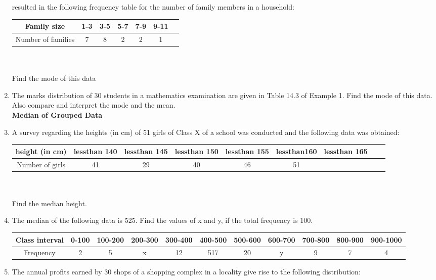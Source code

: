 \begin{enumerate}[label=\arabic*.,ref=\thesubsection.\theenumi]
resulted in the following frequency table for the number of family members in a
household:
\begin{tabular}{|c|c|c|c|c|c|c|}
\hline
Family size &1-3&3-5&5-7&7-9&9-11&\\
\hline
Number of families &7&8&2&2&1\\
\hline
\end{tabular}\\\\
Find the mode of this data
\item The marks distribution of 30 students in a mathematics examination are
given in Table 14.3 of Example 1. Find the mode of this data. Also compare and
interpret the mode and the mean.\\
{\Large \textbf{Median of Grouped Data}}
\item A survey regarding the heights (in cm) of 51 girls of Class X of a school
was conducted and the following data was obtained:
\begin{tabular}{|c|c|c|c|c|c|c|c|c|}
\hline
height (in cm) &lessthan 140&lessthan 145&lessthan 150&lessthan 155&lessthan160&lessthan 165\\
\hline
Number of girls &41&29&40&46&51\\
\hline
\end{tabular}\\\\
Find the median height.
\item The median of the following data is 525. Find the values of x and y, if the
total frequency is 100.
\begin{tabular}{|c|c|c|c|c|c|c|c|c|c|c|}
\hline
Class interval &0-100&100-200&200-300&300-400&400-500&500-600&600-700&700-800&800-900&900-1000\\
\hline
Frequency &2&5&x&12&517&20&y&9&7&4\\
\hline
\end{tabular}
\item The annual profits earned by 30 shops of a shopping complex in a locality give rise to  the following distribution:
\end{enumerate}
        
